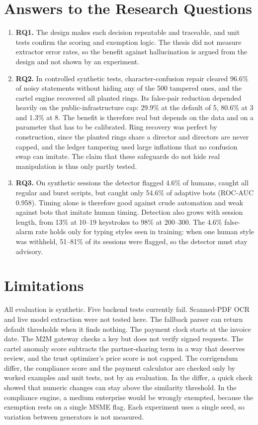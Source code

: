 \section{Answers to the Research Questions}
\begin{enumerate}
    \item \textbf{RQ1.} The design makes each decision repeatable and traceable, and unit tests confirm the scoring and exemption logic. The thesis did not measure extractor error rates, so the benefit against hallucination is argued from the design and not shown by an experiment.
    \item \textbf{RQ2.} In controlled synthetic tests, character-confusion repair cleared 96.6\% of noisy statements without hiding any of the 500 tampered ones, and the cartel engine recovered all planted rings. Its false-pair reduction depended heavily on the public-infrastructure cap: 29.9\% at the default of 5, 80.6\% at 3 and 1.3\% at 8. The benefit is therefore real but depends on the data and on a parameter that has to be calibrated. Ring recovery was perfect by construction, since the planted rings share a director and directors are never capped, and the ledger tampering used large inflations that no confusion swap can imitate. The claim that these safeguards do not hide real manipulation is thus only partly tested.
    \item \textbf{RQ3.} On synthetic sessions the detector flagged 4.6\% of humans, caught all regular and burst scripts, but caught only 54.6\% of adaptive bots (ROC-AUC 0.958). Timing alone is therefore good against crude automation and weak against bots that imitate human timing. Detection also grows with session length, from 13\% at 10--19 keystrokes to 98\% at 200--300. The 4.6\% false-alarm rate holds only for typing styles seen in training: when one human style was withheld, 51--81\% of its sessions were flagged, so the detector must stay advisory.
\end{enumerate}

\section{Limitations}
All evaluation is synthetic. Five backend tests currently fail. Scanned-PDF OCR and live model extraction were not tested here. The fallback parser can return default thresholds when it finds nothing. The payment clock starts at the invoice date. The M2M gateway checks a key but does not verify signed requests. The cartel anomaly score subtracts the partner-sharing term in a way that deserves review, and the trust optimizer's price score is not capped. The corrigendum differ, the compliance score and the payment calculator are checked only by worked examples and unit tests, not by an evaluation. In the differ, a quick check showed that numeric changes can stay above the similarity threshold. In the compliance engine, a medium enterprise would be wrongly exempted, because the exemption rests on a single MSME flag. Each experiment uses a single seed, so variation between generators is not measured.

